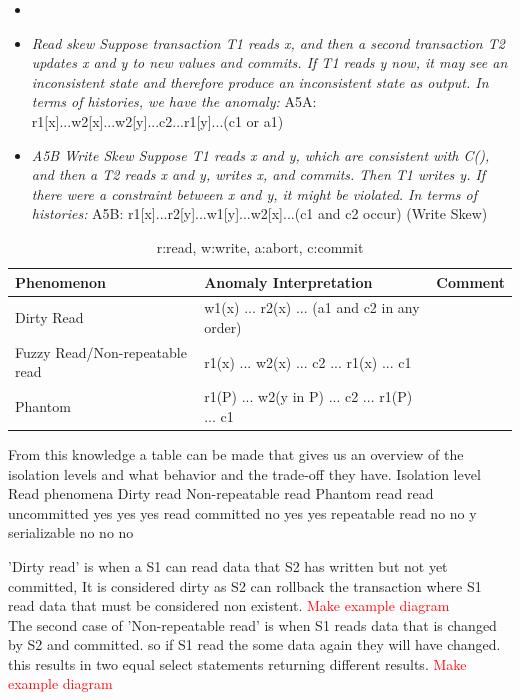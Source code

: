 \documentclass[a4paper,10pt,titlepage]{report}
\begin{document}
\begin{itemize}
\item 
\item \textit{Read skew Suppose transaction T1 reads x, and then a second transaction T2 updates x and y to new values and commits. If T1 reads y now, it may see an inconsistent state and therefore produce an inconsistent state as output.
In terms of histories, we have the anomaly:  }
A5A: r1[x]...w2[x]...w2[y]...c2...r1[y]...(c1 or a1)
\item \textit{A5B Write Skew Suppose T1 reads x and y, which are
consistent with C(), and then a T2 reads x and y, writes x,
and commits. Then T1 writes y. If there were a constraint
between x and y, it might be violated. In terms of histories:}
A5B: r1[x]...r2[y]...w1[y]...w2[x]...(c1 and c2 occur)
(Write Skew)
\end{itemize}



\begin{table}[h]
\begin{tabular}{|l|l|l|}
\hline
Phenomenon & Anomaly Interpretation                           & Comment \\\hline
Dirty Read & w1(x) ... r2(x) ... (a1 and c2 in any order)     &         \\\hline
Fuzzy Read/Non-repeatable read & r1(x) ... w2(x) ... c2 ... r1(x) ... c1      &         \\\hline
Phantom    & r1(P) ... w2(y in P) ... c2 ... r1(P) ... c1 &        \\ \hline
\end{tabular}
\caption{r:read, w:write, a:abort, c:commit}
\end{table}


From this knowledge a table can be made that gives us an overview of the isolation levels and what behavior and the trade-off they have.
Isolation level	Read phenomena
Dirty read	Non-repeatable read	Phantom read
read uncommitted	yes	yes	yes
read committed	no	yes	yes
repeatable read	no	no	y
serializable	no	no	no


'Dirty read' is when a S1 can read data that S2 has written but not yet committed, It is considered dirty as S2 can rollback the transaction where S1 read data that must be considered non existent. \textcolor{red}{Make example diagram}
\\
The second case of 'Non-repeatable read' is when S1 reads data that is changed by S2 and committed. so if S1 read the some data again they will have changed. this results in two equal select statements returning different results.  \textcolor{red}{Make example diagram}
\end{document}
